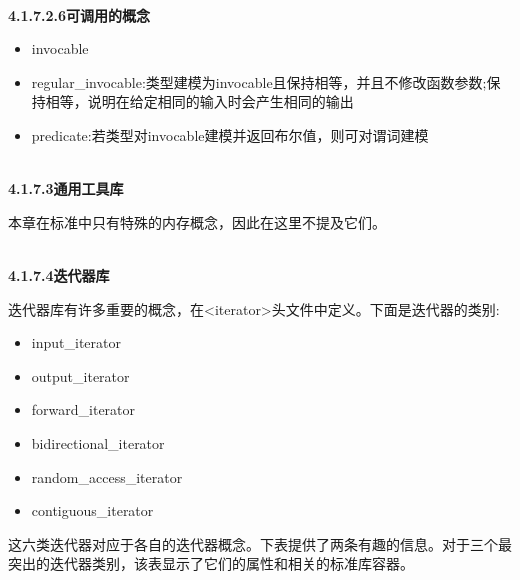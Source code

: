 \hspace*{\fill} \\ %
\noindent
\textbf{4.1.7.2.6\hspace{0.2cm}可调用的概念}

\begin{itemize}
\item
invocable

\item
regular\_invocable:类型建模为invocable且保持相等，并且不修改函数参数;保持相等，说明在给定相同的输入时会产生相同的输出

\item
predicate:若类型对invocable建模并返回布尔值，则可对谓词建模
\end{itemize}

\hspace*{\fill} \\ %
\noindent
\textbf{4.1.7.3\hspace{0.2cm}通用工具库}

本章在标准中只有特殊的内存概念，因此在这里不提及它们。

\hspace*{\fill} \\ %
\noindent
\textbf{4.1.7.4\hspace{0.2cm}迭代器库}

迭代器库有许多重要的概念，在<iterator>头文件中定义。下面是迭代器的类别:

\begin{itemize}
\item
input\_iterator

\item
output\_iterator

\item
forward\_iterator

\item
bidirectional\_iterator

\item
random\_access\_iterator

\item
contiguous\_iterator
\end{itemize}

这六类迭代器对应于各自的迭代器概念。下表提供了两条有趣的信息。对于三个最突出的迭代器类别，该表显示了它们的属性和相关的标准库容器。

